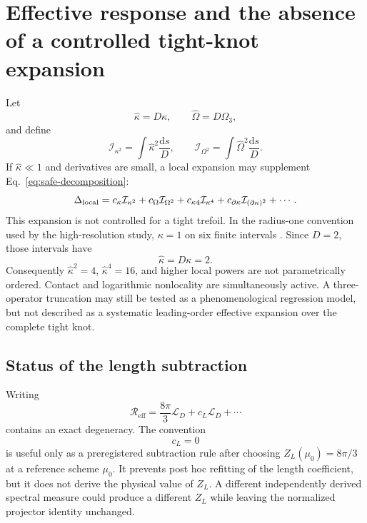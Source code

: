 \documentclass[aps,pre,preprint,notitlepage,nofootinbib,superscriptaddress]{revtex4-2}
\newcommand{\dd}{\mathrm d}
\newcommand{\calL}{\mathcal L}
\newcommand{\calI}{\mathcal I}
\newcommand{\Reff}{\mathscr R_{\mathrm{eff}}}
\newcommand{\ZL}{Z_L}
\begin{document}
\section{Effective response and the absence of a controlled tight-knot expansion}
\label{sec:effective-expansion}

Let
\begin{equation}
  \widehat\kappa=D\kappa,
  \qquad \widehat\Omega=D\Omega_3,
\end{equation}
and define
\begin{equation}
  \calI_{\kappa^2}=\int\widehat\kappa^2\frac{\dd s}{D},
  \qquad
  \calI_{\Omega^2}=\int\widehat\Omega^2\frac{\dd s}{D}.
\end{equation}
If $\widehat\kappa\ll1$ and derivatives are small, a local expansion may supplement Eq.~\eqref{eq:safe-decomposition}:
\begin{equation}
  \Delta_{\rm local}
  =c_\kappa\calI_{\kappa^2}
  +c_\Omega\calI_{\Omega^2}
  +c_{\kappa4}\calI_{\kappa^4}
  +c_{\partial\kappa}\calI_{(\partial\kappa)^2}
  +\cdots.
  \label{eq:local-expansion-v020}
\end{equation}
This expansion is not controlled for a tight trefoil.  In the radius-one convention used by the high-resolution study, $\kappa=1$ on six finite intervals \cite{PrzybylPieranski2014}.  Since $D=2$, those intervals have
\begin{equation}
  \boxed{\widehat\kappa=D\kappa=2.}
  \label{eq:kappa-two}
\end{equation}
Consequently $\widehat\kappa^2=4$, $\widehat\kappa^4=16$, and higher local powers are not parametrically ordered.  Contact and logarithmic nonlocality are simultaneously active.  A three-operator truncation may still be tested as a phenomenological regression model, but not described as a systematic leading-order effective expansion over the complete tight knot.

\subsection{Status of the length subtraction}

Writing
\begin{equation}
  \Reff=\frac{8\pi}{3}\calL_D+c_L\calL_D+\cdots
\end{equation}
contains an exact degeneracy.  The convention
\begin{equation}
  \boxed{c_L=0}
  \label{eq:cL-convention-v020}
\end{equation}
is useful only as a preregistered subtraction rule after choosing $\ZL(\mu_0)=8\pi/3$ at a reference scheme $\mu_0$.  It prevents post hoc refitting of the length coefficient, but it does not derive the physical value of $\ZL$.  A different independently derived spectral measure could produce a different $\ZL$ while leaving the normalized projector identity unchanged.
\end{document}
